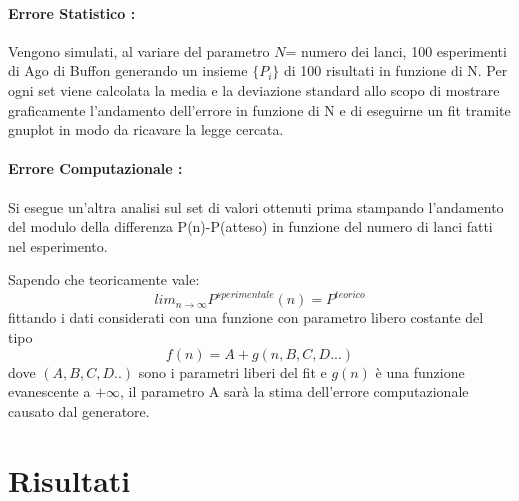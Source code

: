 \documentclass{article}
\begin{document}
\paragraph{Errore Statistico :}
Vengono simulati, al variare del parametro $N$= numero dei lanci,  100 esperimenti di Ago di Buffon generando un insieme $\{ P_{i} \}$ di 100 risultati in funzione di N.
Per ogni set viene calcolata la media e la deviazione standard allo scopo di mostrare graficamente l'andamento dell'errore in funzione di N e di eseguirne un fit tramite gnuplot in modo da ricavare la legge cercata.

\paragraph{Errore Computazionale :}
Si esegue un'altra analisi sul set di valori ottenuti prima stampando l'andamento del modulo della differenza P(n)-P(atteso) in funzione del numero di lanci fatti nel esperimento.

Sapendo che teoricamente vale:
$$ lim_{n \to \infty}P^{sperimentale}(n)=P^{teorico}$$
fittando i dati considerati con una funzione con parametro libero costante del tipo
$$f(n)= A+g(n,B,C,D...)$$
dove $(A,B,C,D..)$ sono i parametri liberi del fit e $g(n)$ è una funzione evanescente a $+\infty$, il parametro A sarà la stima dell'errore computazionale causato dal generatore.




\clearpage
\section{Risultati}
\end{document}
